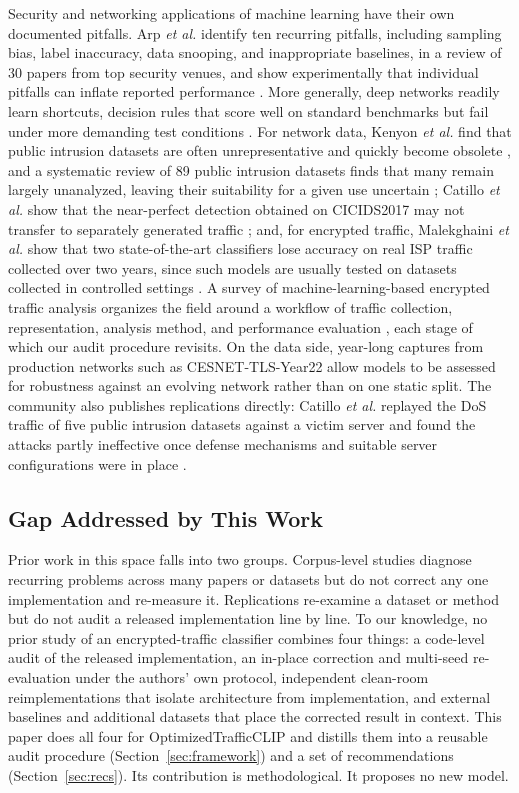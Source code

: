 \documentclass[journal]{IEEEtran}
\begin{document}
Security and networking applications of machine learning have their own documented pitfalls. Arp \emph{et al.} identify ten recurring pitfalls, including sampling bias, label inaccuracy, data snooping, and inappropriate baselines, in a review of 30 papers from top security venues, and show experimentally that individual pitfalls can inflate reported performance \cite{arp2024}. More generally, deep networks readily learn shortcuts, decision rules that score well on standard benchmarks but fail under more demanding test conditions \cite{geirhos2020}. For network data, Kenyon \emph{et al.} find that public intrusion datasets are often unrepresentative and quickly become obsolete \cite{kenyon2020}, and a systematic review of 89 public intrusion datasets finds that many remain largely unanalyzed, leaving their suitability for a given use uncertain \cite{goldschmidt2025}; Catillo \emph{et al.} show that the near-perfect detection obtained on CICIDS2017 may not transfer to separately generated traffic \cite{catillo2022}; and, for encrypted traffic, Malekghaini \emph{et al.} show that two state-of-the-art classifiers lose accuracy on real ISP traffic collected over two years, since such models are usually tested on datasets collected in controlled settings \cite{malekghaini2023}. A survey of machine-learning-based encrypted traffic analysis organizes the field around a workflow of traffic collection, representation, analysis method, and performance evaluation \cite{shen2023}, each stage of which our audit procedure revisits. On the data side, year-long captures from production networks such as CESNET-TLS-Year22 \cite{cesnet2024} allow models to be assessed for robustness against an evolving network rather than on one static split. The community also publishes replications directly: Catillo \emph{et al.} replayed the DoS traffic of five public intrusion datasets against a victim server and found the attacks partly ineffective once defense mechanisms and suitable server configurations were in place \cite{catillo2021}.

\subsection{Gap Addressed by This Work}

Prior work in this space falls into two groups. Corpus-level studies \cite{arp2024,kenyon2020,malekghaini2023} diagnose recurring problems across many papers or datasets but do not correct any one implementation and re-measure it. Replications \cite{catillo2021} re-examine a dataset or method but do not audit a released implementation line by line. To our knowledge, no prior study of an encrypted-traffic classifier combines four things: a code-level audit of the released implementation, an in-place correction and multi-seed re-evaluation under the authors' own protocol, independent clean-room reimplementations that isolate architecture from implementation, and external baselines and additional datasets that place the corrected result in context. This paper does all four for OptimizedTrafficCLIP and distills them into a reusable audit procedure (Section~\ref{sec:framework}) and a set of recommendations (Section~\ref{sec:recs}). Its contribution is methodological. It proposes no new model.
\end{document}

